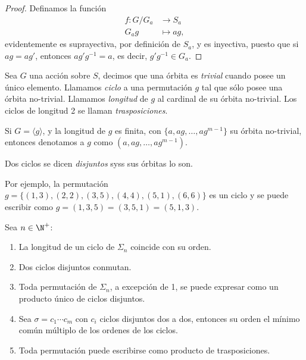 \documentclass[11pt,oneside]{book}
\begin{document}
\begin{proof}
Definamos la función
\begin{align*}
f:G/G_a&\longrightarrow S_a\\
G_ag&\longmapsto ag,
\end{align*}
evidentemente es suprayectiva, por definición de $S_a$, y es inyectiva, puesto que si $ag=ag'$, entonces $ag'g^{-1}=a$, es decir, $g'g^{-1}\in G_a$.
\end{proof}
\begin{mydef}[Ciclo]
Sea $G$ una acción sobre $S$, decimos que una órbita es \textit{trivial} cuando posee un único elemento. Llamamos \textit{ciclo} a una permutación $g$ tal que sólo posee una órbita no-trivial. Llamamos \textit{longitud} de $g$ al cardinal de su órbita no-trivial. Los ciclos de longitud 2 se llaman \textit{trasposiciones}.

Si $G=\langle g\rangle$, y la longitud de $g$ es finita, con $\{a,ag,\dots,ag^{m-1}\}$ su órbita no-trivial, entonces denotamos a $g$ como $(a,ag,\dots,ag^{m-1})$.

Dos ciclos se dicen \textit{disjuntos} syss sus órbitas lo son.
\end{mydef}
Por ejemplo, la permutación $g=\{(1,3),(2,2),(3,5),(4,4),(5,1),(6,6)\}$ es un ciclo y se puede escribir como $g=(1,3,5)=(3,5,1)=(5,1,3)$.
\begin{thm}
Sea $n\in\N^+$:
	\begin{enumerate}
	\item La longitud de un ciclo de $\Sigma_n$ coincide con su orden.
	\item Dos ciclos disjuntos conmutan.
	\item Toda permutación de $\Sigma_n$, a excepción de 1, se puede expresar como un producto único de ciclos disjuntos.
	\item Sea $\sigma=c_1\cdots c_m$ con $c_i$ ciclos disjuntos dos a dos, entonces su orden el mínimo común múltiplo de los ordenes de los ciclos.
	\item Toda permutación puede escribirse como producto de trasposiciones.
	\end{enumerate}
\end{thm}
\end{document}
